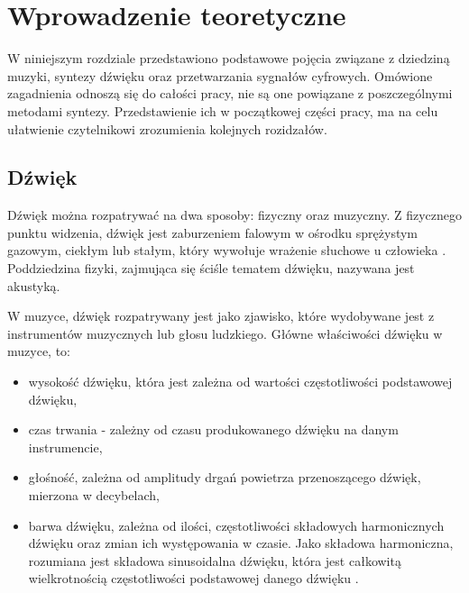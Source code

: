 \chapter{Wprowadzenie teoretyczne}\label{chapter2}

W niniejszym rozdziale przedstawiono podstawowe pojęcia związane z dziedziną muzyki, syntezy dźwięku oraz przetwarzania sygnałów cyfrowych. Omówione zagadnienia odnoszą się do całości pracy, nie są one powiązane z poszczególnymi metodami syntezy. Przedstawienie ich w początkowej części pracy, ma na celu ułatwienie czytelnikowi zrozumienia kolejnych rozidzałów.



\section{Dźwięk}
Dźwięk można rozpatrywać na dwa sposoby: fizyczny oraz muzyczny. Z fizycznego punktu widzenia, dźwięk jest zaburzeniem falowym w ośrodku sprężystym gazowym, ciekłym lub stałym, który wywołuje wrażenie słuchowe u człowieka \cite{dzwiek_pwn}. Poddziedzina fizyki, zajmująca się ściśle tematem dźwięku, nazywana jest akustyką.

W muzyce, dźwięk rozpatrywany jest jako zjawisko, które wydobywane jest z instrumentów muzycznych lub głosu ludzkiego. Główne właściwości dźwięku w muzyce, to:

\begin{itemize}
	\item wysokość dźwięku, która jest zależna od wartości częstotliwości podstawowej dźwięku,
	
	\item czas trwania - zależny od czasu produkowanego dźwięku na danym instrumencie,
	
	\item głośność, zależna od amplitudy drgań powietrza przenoszącego dźwięk, mierzona w decybelach,
	
	\item barwa dźwięku, zależna od ilości, częstotliwości składowych harmonicznych dźwięku oraz zmian ich występowania w czasie. Jako składowa harmoniczna, rozumiana jest składowa sinusoidalna dźwięku, która jest całkowitą wielkrotnością częstotliwości podstawowej danego dźwięku \cite{synth_brief_intro}.
\end{itemize}


